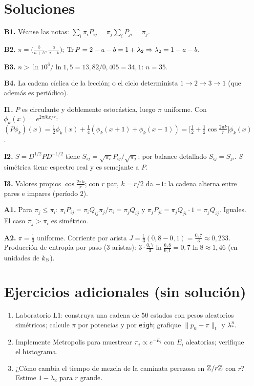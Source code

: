 \documentclass[11pt,a4paper]{article}
\begin{document}
\section{Soluciones}
\begin{solucion}
\textbf{B1.} Véanse las notas: $\sum_i\pi_iP_{ij}=\pi_j\sum_iP_{ji}=\pi_j$.

\textbf{B2.} $\pi=\big(\frac{b}{a+b},\frac{a}{a+b}\big)$; $\operatorname{Tr} P=2-a-b=1+\lambda_2\Rightarrow\lambda_2=1-a-b$.

\textbf{B3.} $n>\ln10^6/\ln1{,}5=13{,}82/0{,}405=34{,}1$: $n=35$.

\textbf{B4.} La cadena cíclica de la lección; o el ciclo determinista $1\to2\to3\to1$ (que además es periódico).

\textbf{I1.} $P$ es circulante y doblemente estocástica, luego $\pi$ uniforme. Con $\phi_k(x)=e^{2\pi ikx/r}$: $(P\phi_k)(x)=\frac12\phi_k(x)+\frac14(\phi_k(x+1)+\phi_k(x-1))=\big[\frac12+\frac12\cos\frac{2\pi k}{r}\big]\phi_k(x)$.

\textbf{I2.} $S=D^{1/2}PD^{-1/2}$ tiene $S_{ij}=\sqrt{\pi_i}P_{ij}/\sqrt{\pi_j}$; por balance detallado $S_{ij}=S_{ji}$. $S$ simétrica tiene espectro real y es semejante a $P$.

\textbf{I3.} Valores propios $\cos\frac{2\pi k}{r}$; con $r$ par, $k=r/2$ da $-1$: la cadena alterna entre pares e impares (período 2).

\textbf{A1.} Para $\pi_j\le\pi_i$: $\pi_iP_{ij}=\pi_iQ_{ij}\pi_j/\pi_i=\pi_jQ_{ij}$ y $\pi_jP_{ji}=\pi_jQ_{ji}\cdot1=\pi_jQ_{ij}$. Iguales. El caso $\pi_j>\pi_i$ es simétrico.

\textbf{A2.} $\pi=\frac13$ uniforme. Corriente por arista $J=\frac13(0{,}8-0{,}1)=\frac{0{,}7}{3}\approx0{,}233$. Producción de entropía por paso (3 aristas): $3\cdot\frac{0{,}7}{3}\ln\frac{0{,}8}{0{,}1}=0{,}7\ln8\approx1{,}46$ (en unidades de $k_{\mathrm B}$).
\end{solucion}

\section{Ejercicios adicionales (sin solución)}
\begin{enumerate}[label=\textbf{P\arabic*.}]
\item Laboratorio L1: construya una cadena de 50 estados con pesos aleatorios simétricos; calcule $\pi$ por potencias y por \texttt{eigh}; grafique $\|p_n-\pi\|_1$ y $\lambda_*^n$.
\item Implemente Metropolis para muestrear $\pi_i\propto e^{-E_i}$ con $E_i$ aleatorias; verifique el histograma.
\item ¿Cómo cambia el tiempo de mezcla de la caminata perezosa en $\mathbb{Z}/r\mathbb{Z}$ con $r$? Estime $1-\lambda_2$ para $r$ grande.
\end{enumerate}
\end{document}
